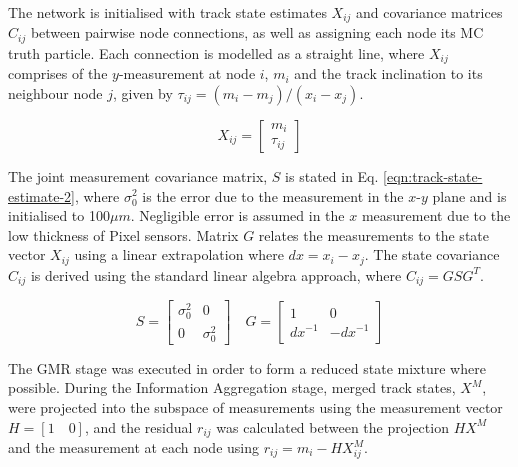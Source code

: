 \newpage

The network is initialised with track state estimates $X_{ij}$ and covariance matrices $C_{ij}$ between pairwise node connections, as well as assigning each node its MC truth particle. Each connection is modelled as a straight line, where $X_{ij}$ comprises of the $y$-measurement at node $i$, $m_i$ and the track inclination to its neighbour node $j$, given by $\tau_{ij} = (m_i - m_j) / (x_i - x_j)$. 

\begin{equation}
X_{ij} = \begin{bmatrix} m_i \\ \tau_{ij} \end{bmatrix}
\label{eqn:track-state-estimate}
\end{equation}

The joint measurement covariance matrix, $S$ is stated in Eq. \eqref{eqn:track-state-estimate-2}, where $\sigma_0^{2}$ is the error due to the measurement in the $x$-$y$ plane and is initialised to 100$\mu m$. Negligible error is assumed in the $x$ measurement due to the low thickness of Pixel sensors. Matrix $G$ relates the measurements to the state vector $X_{ij}$ using a linear extrapolation where $dx = x_i - x_j$. The state covariance $C_{ij}$ is derived using the standard linear algebra approach, where $C_{ij} = GSG^T$. 

\begin{equation}
S = \begin{bmatrix} \sigma_0^{2} & 0 \\ 0 & \sigma_0^{2} \end{bmatrix}  \quad G = \begin{bmatrix} 1 & 0 \\ dx^{-1} & -dx^{-1}  \end{bmatrix}
\label{eqn:track-state-estimate-2}
\end{equation}


The GMR stage was executed in order to form a reduced state mixture where possible. During the Information Aggregation stage, merged track states, $X^M$, were projected into the subspace of measurements using the measurement vector $H = [1 \quad 0]$, and the residual $r_{ij}$ was calculated between the projection $HX^M$ and the measurement at each node using $r_{ij} = m_i - HX_{ij}^M$.


